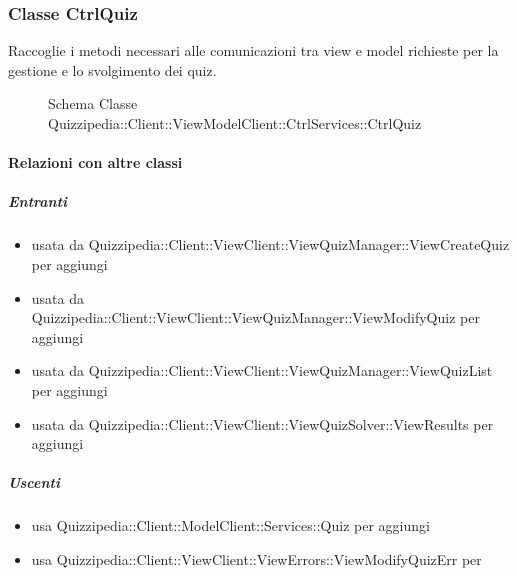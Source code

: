 \subsubsection{Classe CtrlQuiz}
Raccoglie i metodi necessari alle comunicazioni tra view e model richieste per la gestione e lo svolgimento dei quiz.
\begin{figure}[H]
\centering
\noindent{}
\caption[Schema Classe CtrlQuiz]{Schema Classe Quizzipedia::Client::ViewModelClient::CtrlServices::CtrlQuiz}
\end{figure}
\paragraph{Relazioni con altre classi}
\subparagraph{Entranti}
\begin{itemize}
\item usata da Quizzipedia::Client::ViewClient::ViewQuizManager::ViewCreateQuiz per aggiungi
\item usata da Quizzipedia::Client::ViewClient::ViewQuizManager::ViewModifyQuiz per aggiungi
\item usata da Quizzipedia::Client::ViewClient::ViewQuizManager::ViewQuizList per aggiungi
\item usata da Quizzipedia::Client::ViewClient::ViewQuizSolver::ViewResults per aggiungi
\end{itemize}
\subparagraph{Uscenti}
\begin{itemize}
\item usa Quizzipedia::Client::ModelClient::Services::Quiz per aggiungi
\item usa Quizzipedia::Client::ViewClient::ViewErrors::ViewModifyQuizErr per 
\end{itemize}
